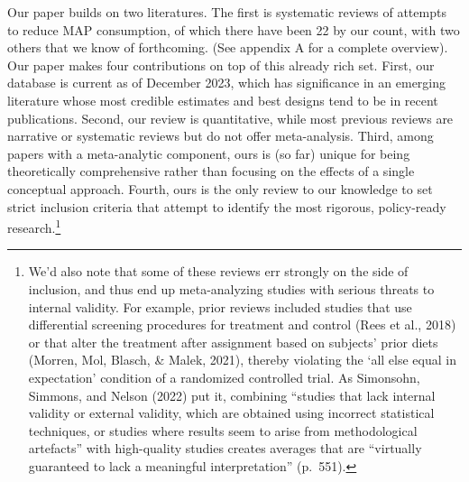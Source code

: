 \documentclass[
  man]{apa6}
\begin{document}
Our paper builds on two literatures. The first is systematic reviews of attempts to reduce MAP consumption, of which there have been 22 by our count, with two others that we know of forthcoming. (See appendix A for a complete overview). Our paper makes four contributions on top of this already rich set. First, our database is current as of December 2023, which has significance in an emerging literature whose most credible estimates and best designs tend to be in recent publications. Second, our review is quantitative, while most previous reviews are narrative or systematic reviews but do not offer meta-analysis. Third, among papers with a meta-analytic component, ours is (so far) unique for being theoretically comprehensive rather than focusing on the effects of a single conceptual approach. Fourth, ours is the only review to our knowledge to set strict inclusion criteria that attempt to identify the most rigorous, policy-ready research.\footnote{We'd also note that some of these reviews err strongly on the side of inclusion, and thus end up meta-analyzing studies with serious threats to internal validity. For example, prior reviews included studies that use differential screening procedures for treatment and control (Rees et al., 2018) or that alter the treatment after assignment based on subjects' prior diets (Morren, Mol, Blasch, \& Malek, 2021), thereby violating the `all else equal in expectation' condition of a randomized controlled trial. As Simonsohn, Simmons, and Nelson (2022) put it, combining ``studies that lack internal validity or external validity, which are obtained using incorrect statistical techniques, or studies where results seem to arise from methodological artefacts'' with high-quality studies creates averages that are ``virtually guaranteed to lack a meaningful interpretation'' (p.~551).}
\end{document}
